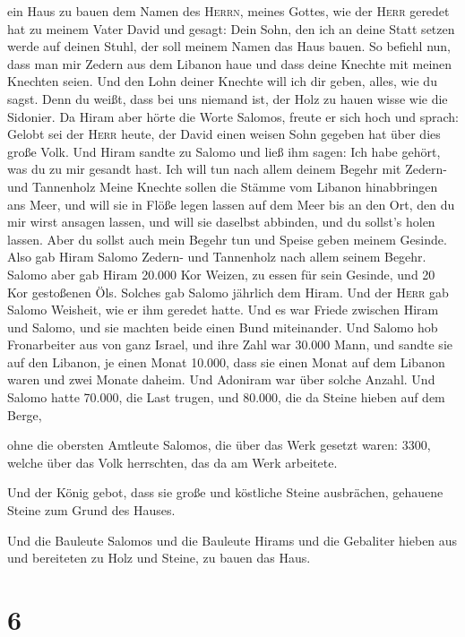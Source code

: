 ein Haus zu bauen dem Namen des \textsc{Herrn}, meines Gottes, wie der
\textsc{Herr} geredet hat zu meinem Vater David und gesagt: Dein Sohn,
den ich an deine Statt setzen werde auf deinen Stuhl, der soll meinem
Namen das Haus bauen.  So befiehl nun, dass man mir
Zedern aus dem Libanon haue und dass deine Knechte mit meinen Knechten
seien. Und den Lohn deiner Knechte will ich dir geben, alles, wie du
sagst. Denn du weißt, dass bei uns niemand ist, der Holz zu hauen wisse
wie die Sidonier.  Da Hiram aber hörte die Worte Salomos,
freute er sich hoch und sprach: Gelobt sei der \textsc{Herr} heute, der
David einen weisen Sohn gegeben hat über dies große Volk.
 Und Hiram sandte zu Salomo und ließ ihm sagen: Ich habe
gehört, was du zu mir gesandt hast. Ich will tun nach allem deinem
Begehr mit Zedern- und Tannenholz  Meine Knechte sollen
die Stämme vom Libanon hinabbringen ans Meer, und will sie in Flöße
legen lassen auf dem Meer bis an den Ort, den du mir wirst ansagen
lassen, und will sie daselbst abbinden, und du sollst's holen lassen.
Aber du sollst auch mein Begehr tun und Speise geben meinem Gesinde.
 Also gab Hiram Salomo Zedern- und Tannenholz nach allem
seinem Begehr.  Salomo aber gab Hiram 20.000 Kor Weizen,
zu essen für sein Gesinde, und 20 Kor gestoßenen Öls. Solches gab Salomo
jährlich dem Hiram.  Und der \textsc{Herr} gab Salomo
Weisheit, wie er ihm geredet hatte. Und es war Friede zwischen Hiram und
Salomo, und sie machten beide einen Bund miteinander. 
Und Salomo hob Fronarbeiter aus von ganz Israel, und ihre Zahl war
30.000 Mann,  und sandte sie auf den Libanon, je einen
Monat 10.000, dass sie einen Monat auf dem Libanon waren und zwei Monate
daheim. Und Adoniram war über solche Anzahl.  Und Salomo
hatte 70.000, die Last trugen, und 80.000, die da Steine hieben auf dem
Berge,

 ohne die obersten Amtleute Salomos, die über das Werk
gesetzt waren: 3300, welche über das Volk herrschten, das da am Werk
arbeitete.

 Und der König gebot, dass sie große und köstliche Steine
ausbrächen, gehauene Steine zum Grund des Hauses.

 Und die Bauleute Salomos und die Bauleute Hirams und die
Gebaliter hieben aus und bereiteten zu Holz und Steine, zu bauen das
Haus.

\hypertarget{section-5}{%
\section{6}\label{section-5}}

